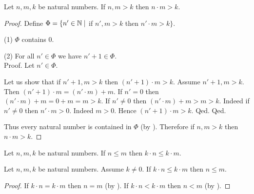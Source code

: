 \documentclass[10pt]{article}
\begin{document}
  \begin{forthel}
    \begin{proposition}[id=ARITHMETIC_06_1826268599287808,printid]
      Let $n, m, k$ be natural numbers.
      If $n, m > k$ then $n \cdot m > k$.
    \end{proposition}
    \begin{proof}
      Define $\Phi = \{ n' \in \mathbb{N} \mid$ if $n', m > k$ then $n' \cdot m > k \}$.

      (1) $\Phi$ contains $0$.

      (2) For all $n' \in \Phi$ we have $n' + 1 \in \Phi$. \\
      Proof.
        Let $n' \in \Phi$.

        Let us show that if $n' + 1, m > k$ then $(n' + 1) \cdot m > k$.
          Assume $n' + 1, m > k$.
          Then $(n' + 1) \cdot m = (n' \cdot m) + m$.
          If $n' = 0$ then
          $(n' \cdot m) + m
            = 0 + m
            = m
            > k$.
          If $n' \neq 0$ then
          $(n' \cdot m) + m
            > m
            > k$.
          Indeed if $n' \neq 0$ then $n' \cdot m > 0$.
          Indeed $m > 0$.
          Hence $(n' + 1) \cdot m > k$.
        Qed.
      Qed.

      Thus every natural number is contained in $\Phi$ (by ).
      Therefore if $n, m > k$ then $n \cdot m > k$.
    \end{proof}
  \end{forthel}

  \begin{forthel}
    \begin{corollary}[id=ARITHMETIC_06_1751605544222720,printid]
      Let $n, m, k$ be natural numbers.
      If $n \leq m$ then $k \cdot n \leq k \cdot m$.
    \end{corollary}
  \end{forthel}

  \begin{forthel}
    \begin{corollary}[id=ARITHMETIC_06_3965209318260736,printid]
      Let $n, m, k$ be natural numbers.
      Assume $k \neq 0$.
      If $k \cdot n \leq k \cdot m$ then $n \leq m$.
    \end{corollary}
    \begin{proof}
      If $k \cdot n = k \cdot m$ then $n = m$ (by ).
      If $k \cdot n < k \cdot m$ then $n < m$ (by ).
    \end{proof}
  \end{forthel}
\end{document}
